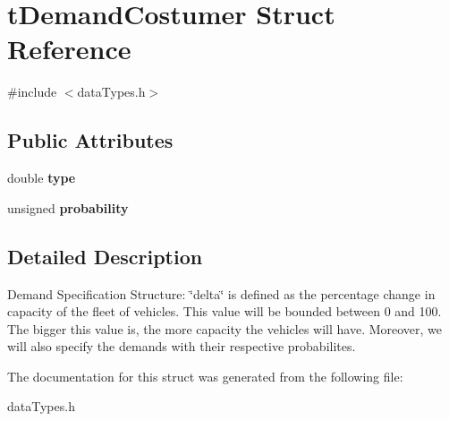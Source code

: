 \hypertarget{structt_demand_costumer}{
\section{tDemandCostumer Struct Reference}
\label{structt_demand_costumer}
}


{\ttfamily \#include $<$dataTypes.h$>$}

\subsection*{Public Attributes}
\begin{DoxyCompactItemize}
\item 
\hypertarget{structt_demand_costumer_a09145343091fa592ec64a9cf7307a888}{
double {\bfseries type}}
\label{structt_demand_costumer_a09145343091fa592ec64a9cf7307a888}

\item 
\hypertarget{structt_demand_costumer_a11940e31c0b6f9332e00764fece0050c}{
unsigned {\bfseries probability}}
\label{structt_demand_costumer_a11940e31c0b6f9332e00764fece0050c}

\end{DoxyCompactItemize}


\subsection{Detailed Description}
Demand Specification Structure: \char`\"{}delta\char`\"{} is defined as the percentage change in capacity of the fleet of vehicles. This value will be bounded between 0 and 100. The bigger this value is, the more capacity the vehicles will have. Moreover, we will also specify the demands with their respective probabilites. 

The documentation for this struct was generated from the following file:\begin{DoxyCompactItemize}
\item 
dataTypes.h\end{DoxyCompactItemize}
